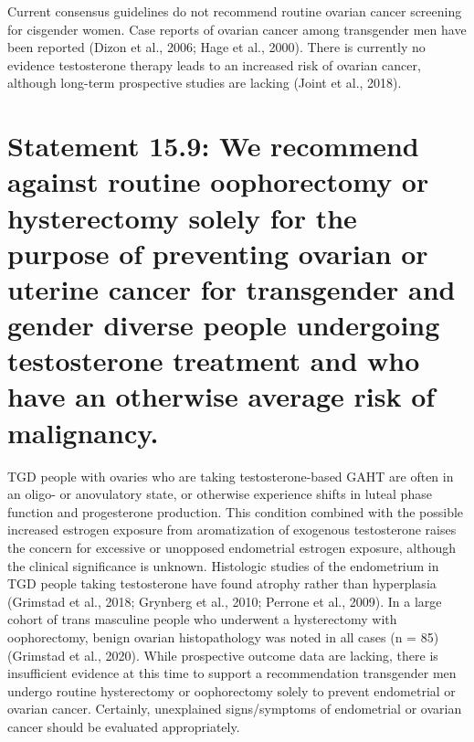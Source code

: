 \documentclass[
]{book}
\begin{document}
Current consensus guidelines do not recommend routine ovarian cancer screening for cisgender women. Case reports of ovarian cancer among
transgender men have been reported (Dizon et al.,
2006; Hage et al., 2000). There is currently no
evidence testosterone therapy leads to an increased
risk of ovarian cancer, although long-term prospective studies are lacking (Joint et al., 2018).

\hypertarget{statement-15.9-we-recommend-against-routine-oophorectomy-or-hysterectomy-solely-for-the-purpose-of-preventing-ovarian-or-uterine-cancer-for-transgender-and-gender-diverse-people-undergoing-testosterone-treatment-and-who-have-an-otherwise-average-risk-of-malignancy.}{%
\section*{Statement 15.9: We recommend against routine oophorectomy or hysterectomy solely for the purpose of preventing ovarian or uterine cancer for transgender and gender diverse people undergoing testosterone treatment and who have an otherwise average risk of malignancy.}\label{statement-15.9-we-recommend-against-routine-oophorectomy-or-hysterectomy-solely-for-the-purpose-of-preventing-ovarian-or-uterine-cancer-for-transgender-and-gender-diverse-people-undergoing-testosterone-treatment-and-who-have-an-otherwise-average-risk-of-malignancy.}}

TGD people with ovaries who are taking
testosterone-based GAHT are often in an oligo- or
anovulatory state, or otherwise experience shifts
in luteal phase function and progesterone production. This condition combined with the possible
increased estrogen exposure from aromatization
of exogenous testosterone raises the concern for
excessive or unopposed endometrial estrogen
exposure, although the clinical significance is
unknown. Histologic studies of the endometrium
in TGD people taking testosterone have found
atrophy rather than hyperplasia (Grimstad et al.,
2018; Grynberg et al., 2010; Perrone et al., 2009).
In a large cohort of trans masculine people who
underwent a hysterectomy with oophorectomy,
benign ovarian histopathology was noted in all
cases (n = 85) (Grimstad et al., 2020). While prospective outcome data are lacking, there is insufficient evidence at this time to support a
recommendation transgender men undergo routine
hysterectomy or oophorectomy solely to prevent
endometrial or ovarian cancer. Certainly, unexplained signs/symptoms of endometrial or ovarian
cancer should be evaluated appropriately.
\end{document}
